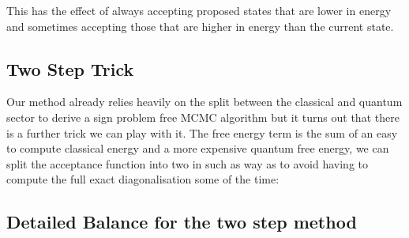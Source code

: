 This has the effect of always accepting proposed states that are lower in energy and sometimes accepting those that are higher in energy than the current state.

\hypertarget{app-mcmc-two-step-trick}{%
\subsection{Two Step Trick}\label{app-mcmc-two-step-trick}}

Our method already relies heavily on the split between the classical and quantum sector to derive a sign problem free MCMC algorithm but it turns out that there is a further trick we can play with it. The free energy term is the sum of an easy to compute classical energy and a more expensive quantum free energy, we can split the acceptance function into two in such as way as to avoid having to compute the full exact diagonalisation some of the time:

\begin{Shaded}
\begin{Highlighting}[]
\OperatorTok{=}

 
\OperatorTok{=}

\OperatorTok{=}
    \OperatorTok{{-}}\OperatorTok{*}\OperatorTok{\textless{}}\NormalTok{,}\NormalTok{):}
\OperatorTok{=}
    
        \OperatorTok{{-}}\OperatorTok{*}\OperatorTok{\textless{}}\NormalTok{,}\NormalTok{):}
\OperatorTok{=}
    
\OperatorTok{=}
    
\end{Highlighting}
\end{Shaded}

\hypertarget{detailed-balance-for-the-two-step-method}{%
\subsection{Detailed Balance for the two step method}\label{detailed-balance-for-the-two-step-method}}

